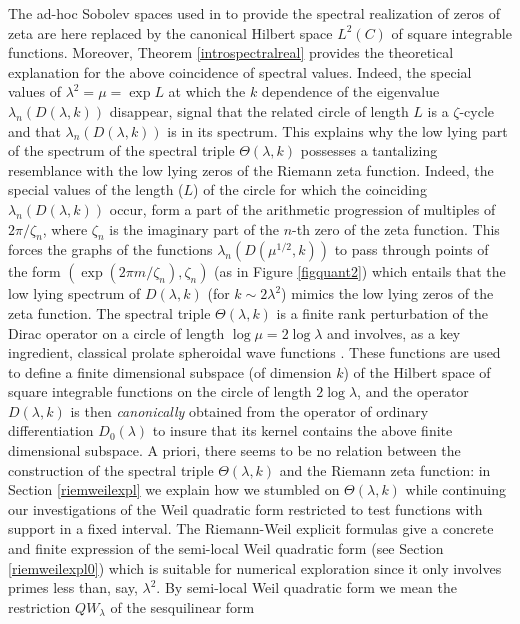 \documentclass[cupthm]{CUP-JNL-JMJ}
\numberwithin{equation}{section}
\theoremstyle{cupplain}
\theoremstyle{cupdefinition}
\theoremstyle{cupremark}
\theoremstyle{cupproof}
\begin{document}
The ad-hoc Sobolev spaces  used in \cite{Co-zeta} to provide the spectral realization of zeros of  zeta   are here replaced by  the canonical Hilbert space $L^2(C)$ of square integrable functions. Moreover, Theorem \ref{introspectralreal} provides the theoretical explanation for  the above coincidence of spectral values. Indeed, the special values of $\lambda^2=\mu=\exp L$ at which the  $k$ dependence of the eigenvalue $\lambda_n(D(\lambda,k))$ disappear, signal  that the related circle of length $L$ is a $\zeta$-cycle and that $\lambda_n(D(\lambda,k))$ is in its spectrum. This  explains why the low lying part of the spectrum of the  spectral triple $\Theta(\lambda,k)$  possesses a tantalizing resemblance with   the low lying zeros of  the Riemann zeta function. Indeed, the special values of the length ($L$) of the circle for which the coinciding  $\lambda_n(D(\lambda,k))$ occur, form a part of the arithmetic progression  of multiples of $2\pi /\zeta_n$, where $\zeta_n$ is the imaginary part of the $n$-th zero of the zeta  function. This forces the graphs of the functions $\lambda_n(D(\mu^{1/2},k))$ to pass through points of the form $(\exp(2\pi m/\zeta_n),\zeta_n)$ (as in Figure \ref{figquant2}) which entails that the low lying spectrum of $D(\lambda,k)$ (for $k\sim 2\lambda^2$)  mimics the low lying zeros of the zeta function.
\newline
The  spectral triple $\Theta(\lambda,k)$ is  a finite rank perturbation of the Dirac operator on a circle of length $\log \mu=2\log \lambda$ and involves, as a key ingredient, classical prolate spheroidal wave functions  \cite{Slepian, Sl, Slepian0}. These functions are used to define a finite dimensional subspace (of dimension $k$) of the Hilbert space of square integrable functions on the circle  of length $2\log\lambda$, and the operator $D(\lambda,k)$ is then \emph{canonically} obtained from the operator of ordinary differentiation $D_0(\lambda)$ to insure that its kernel contains the above finite dimensional subspace.\newline
 A priori, there seems to be no relation between the construction of the spectral triple $\Theta(\lambda,k)$ and the Riemann zeta function:  in  Section \ref{riemweilexpl} we explain how we stumbled on $\Theta(\lambda,k)$ while continuing  our investigations of the Weil quadratic form restricted to test functions with support in a fixed interval. The Riemann-Weil explicit formulas give a concrete and finite expression of the semi-local Weil quadratic form  (see Section \ref{riemweilexpl0}) which is suitable for numerical exploration since it only involves primes less than, say, $\lambda^2$. By  semi-local Weil quadratic form we mean the restriction $QW_\lambda$ of the sesquilinear form 
\end{document}
